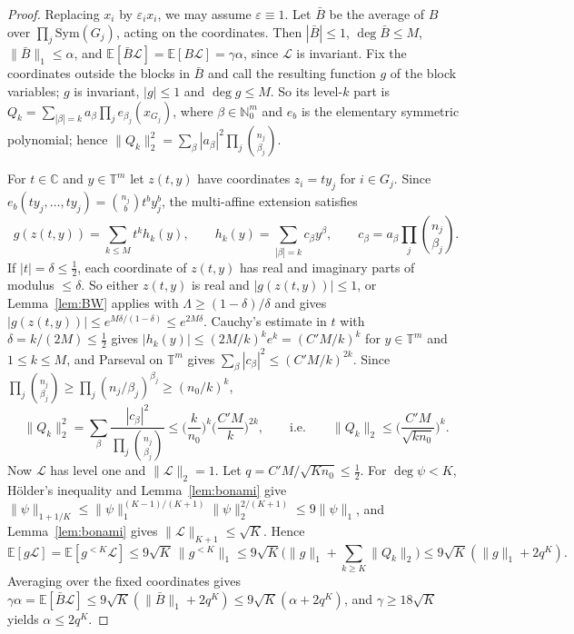 \documentclass[11pt]{amsart}
\theoremstyle{definition}
\newcommand{\C}{\mathbb{C}}
\newcommand{\N}{\mathbb{N}}
\newcommand{\E}{\mathbb{E}}
\newcommand{\T}{\mathbb{T}}
\begin{document}
\begin{proof}
Replacing $x_i$ by $\varepsilon_ix_i$, we may assume $\varepsilon\equiv1$. Let $\bar B$ be the average of $B$ over $\prod_j\mathrm{Sym}(G_j)$, acting on the coordinates. Then $|\bar B|\le1$, $\deg\bar B\le M$, $\|\bar B\|_1\le\alpha$, and $\E[\bar B\mathcal L]=\E[B\mathcal L]=\gamma\alpha$, since $\mathcal L$ is invariant. Fix the coordinates outside the blocks in $\bar B$ and call the resulting function $g$ of the block variables; $g$ is invariant, $|g|\le1$ and $\deg g\le M$. So its level-$k$ part is $Q_k=\sum_{|\beta|=k}a_\beta\prod_je_{\beta_j}(x_{G_j})$, where $\beta\in\N_0^m$ and $e_b$ is the elementary symmetric polynomial; hence $\|Q_k\|_2^2=\sum_\beta|a_\beta|^2\prod_j\binom{n_j}{\beta_j}$.

For $t\in\C$ and $y\in\T^m$ let $z(t,y)$ have coordinates $z_i=ty_j$ for $i\in G_j$. Since $e_b(ty_j,\dots,ty_j)=\binom{n_j}bt^by_j^b$, the multi-affine extension satisfies
\[
g(z(t,y))=\sum_{k\le M}t^kh_k(y),\qquad h_k(y)=\sum_{|\beta|=k}c_\beta y^\beta,\qquad c_\beta=a_\beta\prod_j\binom{n_j}{\beta_j}.
\]
If $|t|=\delta\le\frac12$, each coordinate of $z(t,y)$ has real and imaginary parts of modulus $\le\delta$. So either $z(t,y)$ is real and $|g(z(t,y))|\le1$, or Lemma~\ref{lem:BW} applies with $\Lambda\ge(1-\delta)/\delta$ and gives $|g(z(t,y))|\le e^{M\delta/(1-\delta)}\le e^{2M\delta}$. Cauchy's estimate in $t$ with $\delta=k/(2M)\le\frac12$ gives $|h_k(y)|\le(2M/k)^ke^k=(C'M/k)^k$ for $y\in\T^m$ and $1\le k\le M$, and Parseval on $\T^m$ gives $\sum_\beta|c_\beta|^2\le(C'M/k)^{2k}$. Since $\prod_j\binom{n_j}{\beta_j}\ge\prod_j(n_j/\beta_j)^{\beta_j}\ge(n_0/k)^k$,
\[
\|Q_k\|_2^2=\sum_\beta\frac{|c_\beta|^2}{\prod_j\binom{n_j}{\beta_j}}\le\Big(\frac k{n_0}\Big)^k\Big(\frac{C'M}k\Big)^{2k},\qquad\text{i.e.}\qquad\|Q_k\|_2\le\Big(\frac{C'M}{\sqrt{kn_0}}\Big)^k.
\]
Now $\mathcal L$ has level one and $\|\mathcal L\|_2=1$. Let $q=C'M/\sqrt{Kn_0}\le\frac12$. For $\deg\psi<K$, H\"older's inequality and Lemma~\ref{lem:bonami} give $\|\psi\|_{1+1/K}\le\|\psi\|_1^{(K-1)/(K+1)}\|\psi\|_2^{2/(K+1)}\le9\|\psi\|_1$, and Lemma~\ref{lem:bonami} gives $\|\mathcal L\|_{K+1}\le\sqrt K$. Hence
\[
\E[g\mathcal L]=\E[g^{<K}\mathcal L]\le9\sqrt K\,\|g^{<K}\|_1\le9\sqrt K\Big(\|g\|_1+\sum_{k\ge K}\|Q_k\|_2\Big)\le9\sqrt K(\|g\|_1+2q^K).
\]
Averaging over the fixed coordinates gives $\gamma\alpha=\E[\bar B\mathcal L]\le9\sqrt K(\|\bar B\|_1+2q^K)\le9\sqrt K(\alpha+2q^K)$, and $\gamma\ge18\sqrt K$ yields $\alpha\le2q^K$.
\end{proof}
\end{document}
